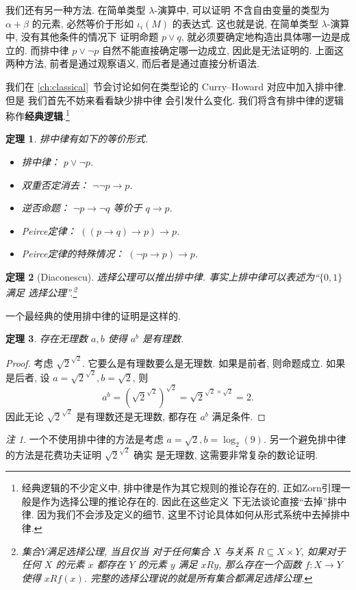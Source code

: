\documentclass[UTF8]{ctexbook}
\theoremstyle{plain}
\newtheorem{theorem}{定理}[chapter]
\theoremstyle{definition}
\theoremstyle{remark}
\newtheorem*{remark}{注}
\begin{document}
我们还有另一种方法. 在简单类型 \(\lambda\)-演算中, 可以证明
不含自由变量的类型为 \(\alpha + \beta\) 的元素,
必然等价于形如 \(\iota_i(M)\) 的表达式. 这也就是说,
在简单类型 \(\lambda\)-演算中, 没有其他条件的情况下
证明命题 \(p\vee q\), 就必须要确定地构造出具体哪一边是成立的.
而排中律 \(p \vee \neg p\) 自然不能直接确定哪一边成立,
因此是无法证明的. 上面这两种方法, 前者是通过观察语义,
而后者是通过直接分析语法.

我们在 \ref{ch:classical}~节会讨论如何在类型论的
Curry--Howard 对应中加入排中律. 但是
我们首先不妨来看看缺少排中律
会引发什么变化. 我们将含有排中律的逻辑
称作\textbf{经典逻辑}.\footnote{经典逻辑的不少定义中,
排中律是作为其它规则的推论存在的,
正如Zorn引理一般是作为选择公理的推论存在的. 因此在这些定义
下无法谈论直接“去掉”排中律. 因为我们不会涉及定义的细节,
这里不讨论具体如何从形式系统中去掉排中律.}
\begin{theorem}
排中律有如下的等价形式.
\begin{itemize}
\item 排中律： \(p \vee \neg p\).
\item 双重否定消去： \(\neg\neg p \to p\).
\item 逆否命题： \(\neg p \to \neg q\) 等价于 \(q \to p\).
\item Peirce定律： \(((p \to q) \to p) \to p\).
\item Peirce定律的特殊情况： \((\neg p\to p) \to p\).
\end{itemize}
\end{theorem}
\begin{theorem}[Diaconescu]
选择公理可以推出排中律.
事实上排中律可以表述为“\(\{0,1\}\)满足
选择公理”.\footnote{集合\(Y\)满足选择公理, 当且仅当
对于任何集合 \(X\) 与关系 \(R \subseteq X \times Y\), 如果对于
任何 \(X\) 的元素 \(x\) 都存在 \(Y\) 的元素 \(y\)
满足 \(xRy\), 那么存在一个函数 \(f : X \to Y\) 使得
\(xRf(x)\). 完整的选择公理说的就是所有集合都满足选择公理.}
\end{theorem}

一个最经典的使用排中律的证明是这样的.
\begin{theorem}
存在无理数 \(a,b\) 使得 \(a^b\) 是有理数.
\end{theorem}
\begin{proof}
考虑 \({\sqrt2}^{\sqrt2}\). 它要么是有理数要么是无理数.
如果是前者, 则命题成立. 如果是后者, 设 \(a = {\sqrt2}^{\sqrt2},
b = \sqrt 2\), 则
\[a^b = \left({\sqrt2}^{\sqrt2}\right)^{\sqrt2} = {\sqrt2}^{\sqrt2\times\sqrt2} = 2.\]
因此无论 \({\sqrt2}^{\sqrt2}\) 是有理数还是无理数,
都存在 \(a^b\) 满足条件.
\end{proof}
\begin{remark}
一个不使用排中律的方法是考虑 \(a = \sqrt 2, b = \log_2(9)\).
另一个避免排中律的方法是花费功夫证明 \({\sqrt2}^{\sqrt2}\) 确实
是无理数, 这需要非常复杂的数论证明.
\end{remark}
\end{document}
